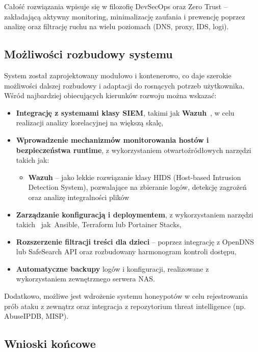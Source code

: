 \documentclass[
    left=2.5cm,         %
    right=2.5cm,        %
    top=2.5cm,          %
    bottom=3cm,         %
    bindingoffset=6mm,  %
    nohyphenation=true %
]{eiti/eiti-thesis} %
\begin{document}
Całość rozwiązania wpisuje się w filozofię DevSecOps\cite{microsoft-devsecops} oraz Zero Trust\cite{microsoft-zero-trust} – zakładającą aktywny monitoring, minimalizację zaufania i prewencję poprzez analizę oraz filtrację ruchu na wielu poziomach (DNS, proxy, IDS, logi).

\subsection{Możliwości rozbudowy systemu}

System został zaprojektowany modułowo i kontenerowo, co daje szerokie możliwości dalszej rozbudowy i adaptacji do rosnących potrzeb użytkownika. Wśród najbardziej obiecujących kierunków rozwoju można wskazać:
\begin{itemize}
    \item \textbf{Integrację z systemami klasy SIEM}, takimi jak \textbf{Wazuh}~\cite{wazuh_docs}, w celu realizacji analizy korelacyjnej na większą skalę,
    \item \textbf{Wprowadzenie mechanizmów monitorowania hostów i bezpieczeństwa runtime}, z wykorzystaniem otwartoźródłowych narzędzi takich jak:
    \begin{itemize}
        \item \textbf{Wazuh} – jako lekkie rozwiązanie klasy HIDS (Host-based Intrusion Detection System), pozwalające na zbieranie logów, detekcję zagrożeń 
        oraz analizę integralności plików~\cite{wazuh_agent}
    \end{itemize}
    \item \textbf{Zarządzanie konfiguracją i deploymentem}, z wykorzystaniem narzędzi takich ~jak~Ansible, Terraform lub Portainer Stacks,
    \item \textbf{Rozszerzenie filtracji treści dla dzieci} – poprzez integrację z OpenDNS lub SafeSearch API oraz rozbudowany harmonogram kontroli dostępu,
    \item \textbf{Automatyczne backupy} logów i konfiguracji, realizowane z wykorzystaniem zewnętrznego serwera NAS.
\end{itemize}

Dodatkowo, możliwe jest wdrożenie systemu honeypotów\cite{honeypot_wiki} w celu rejestrowania prób ataku z zewnątrz oraz integracja z repozytorium threat intelligence (np. AbuseIPDB, MISP).

\subsection{Wnioski końcowe}
\end{document}
